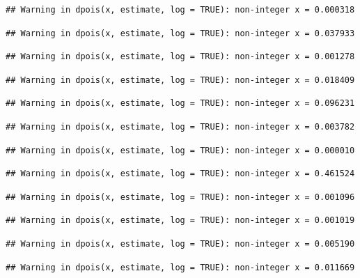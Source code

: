\documentclass[]{article}
\begin{document}
\begin{verbatim}
## Warning in dpois(x, estimate, log = TRUE): non-integer x = 0.000318
\end{verbatim}

\begin{verbatim}
## Warning in dpois(x, estimate, log = TRUE): non-integer x = 0.037933
\end{verbatim}

\begin{verbatim}
## Warning in dpois(x, estimate, log = TRUE): non-integer x = 0.001278
\end{verbatim}

\begin{verbatim}
## Warning in dpois(x, estimate, log = TRUE): non-integer x = 0.018409
\end{verbatim}

\begin{verbatim}
## Warning in dpois(x, estimate, log = TRUE): non-integer x = 0.096231
\end{verbatim}

\begin{verbatim}
## Warning in dpois(x, estimate, log = TRUE): non-integer x = 0.003782
\end{verbatim}

\begin{verbatim}
## Warning in dpois(x, estimate, log = TRUE): non-integer x = 0.000010
\end{verbatim}

\begin{verbatim}
## Warning in dpois(x, estimate, log = TRUE): non-integer x = 0.461524
\end{verbatim}

\begin{verbatim}
## Warning in dpois(x, estimate, log = TRUE): non-integer x = 0.001096
\end{verbatim}

\begin{verbatim}
## Warning in dpois(x, estimate, log = TRUE): non-integer x = 0.001019
\end{verbatim}

\begin{verbatim}
## Warning in dpois(x, estimate, log = TRUE): non-integer x = 0.005190
\end{verbatim}

\begin{verbatim}
## Warning in dpois(x, estimate, log = TRUE): non-integer x = 0.011669
\end{verbatim}
\end{document}
